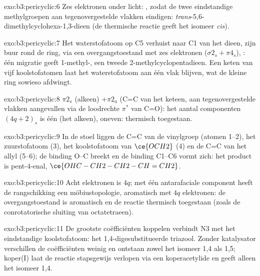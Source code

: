 \begin{solution}{exo:b3:pericyclic:6}
Zes elektronen onder licht: , zodat de twee eindstandige
methylgroepen aan tegenovergestelde vlakken eindigen:
\textit{trans}-5,6-dimethylcyclohexa-1,3-dieen (de thermische reactie geeft
het isomeer \textit{cis}).
\end{solution}

\begin{solution}{exo:b3:pericyclic:7}
Het waterstofatoom op C5 verhuist naar C1 van het dieen, zijn buur rond
de ring, via een overgangstoestand met zes elektronen ($\sigma2_s + \pi4_s$), : één migratie
geeft 1-methyl-, een tweede 2-methylcyclopentadieen. Een keten van vijf
koolstofatomen laat het waterstofatoom aan één vlak blijven, wat de
kleine ring sowieso afdwingt.
\end{solution}

\begin{solution}{exo:b3:pericyclic:8}
$\pi2_s$ (alkeen) $+ \pi2_a$ (C=C van het keteen, aan tegenovergestelde vlakken aangevallen via de
loodrechte $\pi^*$ van C=O): het aantal componenten $(4q + 2)_s$ is één (het alkeen), oneven:
thermisch toegestaan.
\end{solution}

\begin{solution}{exo:b3:pericyclic:9}
In de stoel liggen de C=C van de vinylgroep (atomen 1--2), het zuurstofatoom (3), het koolstofatoom van $\ce{OCH2}$
(4) en de C=C van het allyl (5--6); de binding O--C breekt en de binding C1--C6 vormt zich:
het product is pent-4-enal,
$\ce{OHC-CH2-CH2-CH=CH2}$.
\end{solution}

\begin{solution}{exo:b3:pericyclic:10}
Acht elektronen is $4q$; met één antarafaciale component heeft de
rangschikking een möbiustopologie, aromatisch met $4q$ elektronen: de overgangstoestand is aromatisch en de
reactie thermisch toegestaan (zoals de conrotatorische sluiting van
octatetraeen).
\end{solution}

\begin{solution}{exo:b3:pericyclic:11}
De grootste coëfficiënten koppelen verbindt N3 met het eindstandige
koolstofatoom: het 1,4-digesubstitueerde triazool. Zonder katalysator
verschillen de coëfficiënten weinig en ontstaan zowel het isomeer 1,4 als
1,5; koper(I) laat de reactie stapsgewijs verlopen via een
koperacetylide en geeft alleen het isomeer 1,4.
\end{solution}

